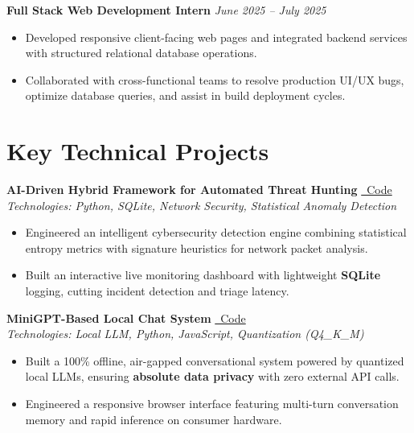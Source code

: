 \documentclass[a4paper,11pt]{article}
\begin{document}
\vspace{4pt}
\noindent
\textbf{Full Stack Web Development Intern} \hfill \textit{June 2025 -- July 2025}
\begin{itemize}
    \item Developed responsive client-facing web pages and integrated backend services with structured relational database operations.
    \item Collaborated with cross-functional teams to resolve production UI/UX bugs, optimize database queries, and assist in build deployment cycles.
\end{itemize}

\section{Key Technical Projects}

\noindent
\textbf{AI-Driven Hybrid Framework for Automated Threat Hunting} \hfill \href{https://github.com/Kishorekumar-2004/Hybrid-ids}{\faGithub\ Code} \\
\textit{Technologies: Python, SQLite, Network Security, Statistical Anomaly Detection}
\begin{itemize}
    \item Engineered an intelligent cybersecurity detection engine combining statistical entropy metrics with signature heuristics for network packet analysis.
    \item Built an interactive live monitoring dashboard with lightweight \textbf{SQLite} logging, cutting incident detection and triage latency.
\end{itemize}

\vspace{3pt}
\noindent
\textbf{MiniGPT-Based Local Chat System} \hfill \href{https://github.com/Kishorekumar-2004/Offline-llm-chatbot}{\faGithub\ Code} \\
\textit{Technologies: Local LLM, Python, JavaScript, Quantization (Q4\_K\_M)}
\begin{itemize}
    \item Built a 100\% offline, air-gapped conversational system powered by quantized local LLMs, ensuring \textbf{absolute data privacy} with zero external API calls.
    \item Engineered a responsive browser interface featuring multi-turn conversation memory and rapid inference on consumer hardware.
\end{itemize}
\end{document}
